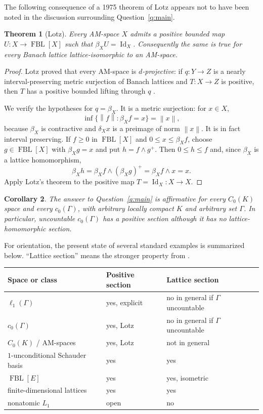 \documentclass[11pt]{article}
\newtheorem{theorem}{Theorem}[section]
\newtheorem{corollary}[theorem]{Corollary}
\newcommand{\FBL}{\operatorname{FBL}}
\newcommand{\Id}{\operatorname{Id}}
\newcommand{\norm}[1]{\left\lVert #1\right\rVert}
\begin{document}
The following consequence of a 1975 theorem of Lotz appears not to have been
noted in the discussion surrounding Question~\ref{q:main}.

\begin{theorem}[Lotz]\label{thm:lotz}
Every AM-space $X$ admits a positive bounded map
$U:X\to\FBL[X]$ such that $\beta_XU=\Id_X$.
Consequently the same is true for every Banach lattice lattice-isomorphic to
an AM-space.
\end{theorem}

\begin{proof}
Lotz proved that every AM-space is \emph{$d$-projective}: if
$q:Y\to Z$ is a nearly interval-preserving metric surjection of Banach
lattices and $T:X\to Z$ is positive, then $T$ has a positive bounded lifting
through $q$ \cite[Proposition~3.3]{Lotz1975}.

We verify the hypotheses for $q=\beta_X$.  It is a metric surjection: for
$x\in X$,
\[
 \inf\{\norm f:\beta_Xf=x\}=\norm x,
\]
because $\beta_X$ is contractive and $\delta_Xx$ is a preimage of norm
$\norm x$.  It is in fact interval preserving.  If $f\geq0$ in $\FBL[X]$ and
$0\leq x\leq\beta_Xf$, choose $g\in\FBL[X]$ with $\beta_Xg=x$ and put
$h=f\wedge g^+$.  Then $0\leq h\leq f$ and, since $\beta_X$ is a lattice
homomorphism,
\[
 \beta_Xh=\beta_Xf\wedge(\beta_Xg)^+
 =\beta_Xf\wedge x=x.
\]
Apply Lotz's theorem to the positive map $T=\Id_X:X\to X$.
\end{proof}

\begin{corollary}\label{cor:am}
The answer to Question~\ref{q:main} is affirmative for every $C_0(K)$ space and every
$c_0(\Gamma)$, with arbitrary locally compact $K$ and arbitrary set $\Gamma$.
In particular, uncountable $c_0(\Gamma)$ has a positive section although it
has no lattice-homomorphic section.
\end{corollary}

For orientation, the present state of several standard examples is summarized
below.  ``Lattice section'' means the stronger property from
\cite{AvilesEtAl2022}.

\begin{center}
\begin{tabular}{@{}lll@{}}
\toprule
Space or class & Positive section & Lattice section \\
\midrule
$\ell_1(\Gamma)$ & yes, explicit & no in general if $\Gamma$ uncountable \\
$c_0(\Gamma)$ & yes, Lotz & no in general if $\Gamma$ uncountable \\
$C_0(K)$ / AM-spaces & yes, Lotz & not in general \\
$1$-unconditional Schauder basis & yes & yes \\
$\FBL[E]$ & yes & yes, isometric \\
finite-dimensional lattices & yes & yes \\
nonatomic $L_1$ & open & no \\
\bottomrule
\end{tabular}
\end{center}
\end{document}
